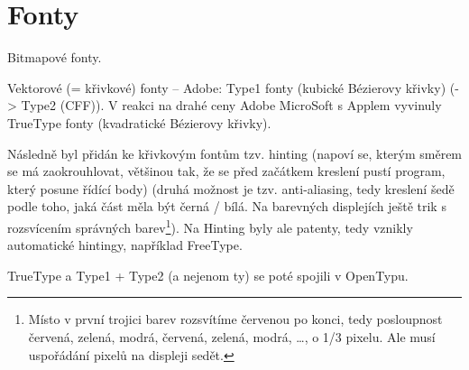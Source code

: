 \documentclass[12pt]{article}					%
\begin{document}
\section{Fonty}
    \begin{poznamka}[Historie]
        Bitmapové fonty.

        Vektorové (= křivkové) fonty -- Adobe: Type1 fonty (kubické Bézierovy křivky) (-> Type2 (CFF)). V reakci na drahé ceny Adobe MicroSoft s Applem vyvinuly TrueType fonty (kvadratické Bézierovy křivky).

        Následně byl přidán ke křivkovým fontům tzv. hinting (napoví se, kterým směrem se má zaokrouhlovat, většinou tak, že se před začátkem kreslení pustí program, který posune řídící body) (druhá možnost je tzv. anti-aliasing, tedy kreslení šedě podle toho, jaká část měla být černá / bílá. Na barevných displejích ještě trik s rozsvícením správných barev\footnote{Místo v první trojici barev rozsvítíme červenou po konci, tedy posloupnost červená, zelená, modrá, červená, zelená, modrá, …, o 1/3 pixelu. Ale musí uspořádání pixelů na displeji sedět.}). Na Hinting byly ale patenty, tedy vznikly automatické hintingy, například FreeType.

        TrueType a Type1 + Type2 (a nejenom ty) se poté spojili v OpenTypu.
    \end{poznamka}
\end{document}
